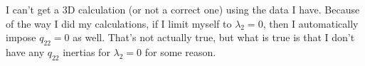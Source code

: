 \noindent I can't get a 3D calculation (or not a correct one) using the data I have. Because of the way I did my calculations, if I limit myself to $\lambda_2=0$, then I automatically impose $q_{22}=0$ as well. That's not actually true, but what is true is that I don't have any $q_{22}$ inertias for $\lambda_2=0$ for some reason.

